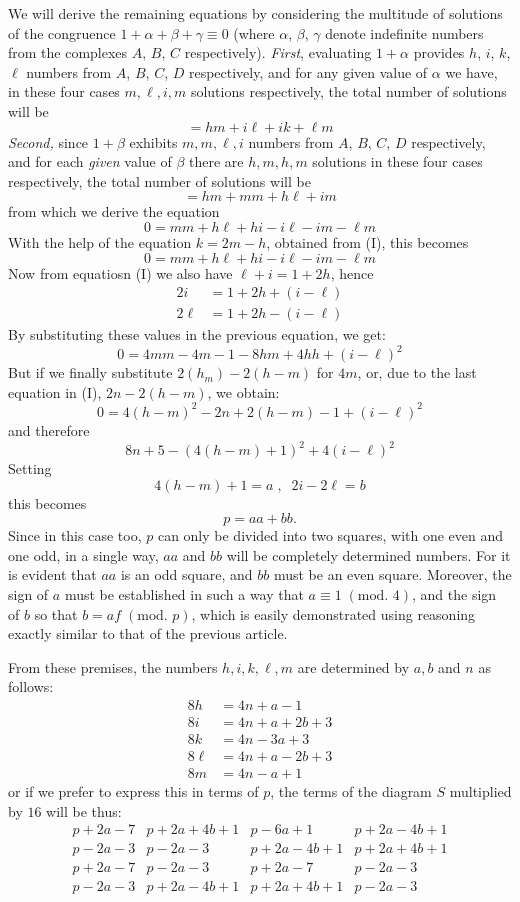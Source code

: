 \documentclass{book}
\theoremstyle{plain}
\theoremstyle{remark}
\begin{document}
 We will derive the remaining equations by considering the multitude of solutions of the congruence $1 + \alpha + \beta + \gamma \equiv 0$ (where $\alpha$, $\beta$, $\gamma$ denote indefinite numbers from the complexes $A$, $B$, $C$ respectively).  \textit{First}, evaluating $1+\alpha$ provides  $h$, $i$, $k$, $\ell$ numbers from $A$, $B$, $C$, $D$ respectively, and for any given value of $\alpha$ we have, in these four cases $m, \ell, i, m$ solutions respectively, the total number of solutions will be
 \[ = hm + i\ell + ik + \ell m \]
 \textit{Second,} since $1 + \beta$ exhibits $m, m, \ell, i$ numbers from $A$, $B$, $C$, $D$ respectively, and for each \emph{given} value of $\beta$ there are $h, m, h, m$ solutions in these four cases respectively, the total number of solutions will be 
 \[ = hm + mm + h\ell + im \]
 from which we derive the equation
 \[ 0 = mm + h\ell+hi -i\ell-im-\ell m \]
 With the help of the equation $k = 2m-h$, obtained from (I), this becomes
 \[ 0 = mm + h\ell + hi -i\ell-im-\ell m \]
 Now from equatiosn (I) we also have $\ell + i = 1 + 2h$, hence 
 \begin{align*}
 2i &= 1 + 2h + (i-\ell) \\
 2\ell &= 1 + 2h-(i-\ell) 
 \end{align*}
 By substituting these values in the previous equation, we get:
 \[ 0 = 4mm - 4m - 1 - 8hm + 4hh + (i-\ell)^2 \]
 But if we finally substitute $2(h_m)-2(h-m)$ for $4m$, or, due to the last equation in (I), $2n-2(h-m)$, we obtain:
 \[ 0 = 4(h-m)^2-2n+2(h-m)-1+(i-\ell)^2 \]
 and therefore 
 \[ 8n+5 - (4(h-m)+1)^2 + 4(i-\ell)^2 \]
 Setting 
 \[ 4(h-m) + 1 = a\;, \;\; 2i-2\ell = b \]
 this becomes 
 \[ p = aa + bb. \]
 Since in this case too, $p$ can only be divided into two squares, with one even and one odd, in a single way, $aa$ and $bb$ will be completely determined numbers.  For it is evident that $aa$ is an odd square, and $bb$ must be an even square.  Moreover, the sign of $a$ must be established in such a way that $a \equiv 1 \;(\textrm{mod. }4)$, and the sign of $b$ so that $b = af \;(\textrm{mod. }p)$, which is easily demonstrated  using reasoning exactly similar to that of the previous article.   
 
 From these premises, the numbers $h, i, k , \ell, m$ are determined by $a,b$ and $n$ as follows:
 \begin{align*}
 8h &= 4n+a-1 \\
 8i &= 4n+a+2b+3 \\
 8k &= 4n -3a + 3 \\
 8\ell &= 4n+a-2b+3 \\
 8m &= 4n-a+1 
 \end{align*} 
 or if we prefer to express this in terms of $p$, the terms of the diagram $S$ multiplied by $16$ will be thus:
 \[
\begin{array}{l|l|l|l}
p+2a-7 & p+2a+4b+1&p-6a+1&p+2a-4b+1\\
p-2a-3&p-2a-3&p+2a-4b+1&p+2a+4b+1 \\
p+2a-7 & p-2a-3& p+2a-7 & p-2a-3 \\
p-2a-3&p+2a-4b+1&p+2a+4b+1&p-2a-3 
\end{array}
\]
\end{document}
